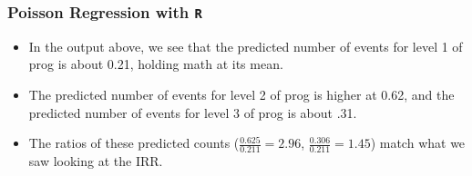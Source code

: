 \documentclass[00-GLMregslides.tex]{subfiles}
\begin{document}
\begin{frame}[fragile]

\frametitle{Poisson Regression with \texttt{R}}
\Large 
\begin{itemize}
\item 
In the output above, we see that the predicted number of events for level 1 of prog is about 0.21, holding math at its mean.
\item The predicted number of events for level 2 of prog is higher at 0.62, and the predicted number of events for level 
3 of prog is about .31. 
\item The ratios of these predicted counts (\(\frac{0.625}{0.211} = 2.96\), \(\frac{0.306}{0.211} = 1.45\)) match what 
we saw looking at the IRR.
\end{itemize}
\end{frame}
\end{document}
